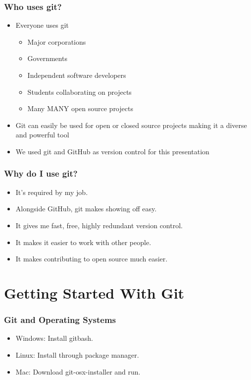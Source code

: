 \documentclass[unknownkeysallowed]{beamer}
\begin{document}
\begin{frame}
    \frametitle{Who uses git?}
    \begin{itemize}
        \item{Everyone uses git}
            \begin{itemize}
                \item{Major corporations}
                \item{Governments}
                \item{Independent software developers}
                \item{Students collaborating on projects}
                \item{Many MANY open source projects}
           \end{itemize}
        \item{Git can easily be used for open or closed source projects making it a diverse and powerful tool}
        \item{We used git and GitHub as version control for this presentation}
    \end{itemize}
    \vspace{1cm} %
\end{frame}

\begin{frame}
    \frametitle{Why do I use git?}
    \begin{itemize}
        \item{It's required by my job.}
        \item{Alongside GitHub, git makes showing off easy.}
        \item{It gives me fast, free, highly redundant version control.}
        \item{It makes it easier to work with other people.}
        \item{It makes contributing to open source much easier.}
    \end{itemize}
    \vspace{1cm} %
\end{frame}

\section{Getting Started With Git}
\begin{frame}
    \frametitle{Git and Operating Systems}
    \begin{itemize}
        \item{Windows: Install gitbash.}
        \item{Linux: Install through package manager.}
        \item{Mac: Download git-osx-installer and run. }
    \end{itemize}
    \vspace{1cm} %
\end{frame}
\end{document}
